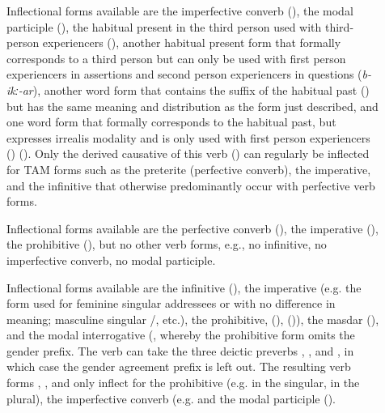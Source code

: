 \begin{description}
\item[ ]
		Inflectional forms available are the imperfective converb (), the modal participle (), the habitual present in the third person used with third-person experiencers (), another habitual present form that formally corresponds to a third person but can only be used with first person experiencers in assertions and second person experiencers in questions (\textit{b-ikː-ar}), another word form that contains the suffix of the habitual past () but has the same meaning and distribution as the form just described, and one word form that formally corresponds to the habitual past, but expresses irrealis modality and is only used with first person experiencers () (). Only the derived causative of this verb () can regularly be inflected for TAM forms such as the preterite (perfective converb), the imperative, and the infinitive that otherwise predominantly occur with perfective verb forms.

\item[ ]
		Inflectional forms available are the perfective converb (), the imperative (), the prohibitive (), but no other verb forms, e.g., no infinitive, no imperfective converb, no modal participle.
		
\item[ ]
		Inflectional forms available are the infinitive (), the imperative (e.g. the form used for feminine singular addressees  or  with no difference in meaning; masculine singular \slash{}, etc.), the prohibitive,  (),  ()), the masdar (), and the modal interrogative (, whereby the prohibitive form omits the gender prefix. The verb can take the three deictic preverbs , , and , in which case the gender agreement prefix is left out. The resulting verb forms , , and  only inflect for the prohibitive (e.g.  in the singular,  in the plural), the imperfective converb (e.g.  and the modal participle ().
\end{description}

